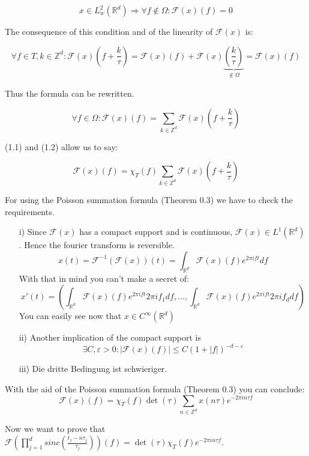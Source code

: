 \documentclass[a4paper, 11pt]{scrreprt}
\newcommand{\RR}{\mathbb{R}}
\newcommand{\ZZ}{\mathbb{Z}}
\newcommand{\FF}{\mathcal{F}}
\begin{document}
\begin{equation}
x \in L^2_w(\RR^d) \Rightarrow \forall f\notin \Omega: \FF(x)(f) = 0
\end{equation}

The consequence of this condition and of the linearity of \(\FF(x)\) is:

\[\forall f\in T, k \in \ZZ^d: \FF(x)\left(f+\frac{k}{\tau}\right) = \FF(x)(f) + \FF(x)\underbrace{\left(\frac{k}{\tau}\right)}_{\notin \Omega} = \FF(x)(f)\]

Thus the formula can be rewritten.

\begin{equation}
\forall f \in \Omega: \FF(x)(f) = \sum_{k \in \ZZ^d} \FF(x)\left( f+\frac{k}{\tau}\right)
\end{equation} 

(1.1) and (1.2) allow us to say:

\[\FF(x)(f) = \chi_{T}(f) \sum_{k \in \ZZ^d} \FF(x)\left(f+\frac{k}{\tau}\right)\]

For using the Poisson summation formula (Theorem 0.3) we have to check the requirements.

\begin{itemize}
	\item[i)] Since \(\FF(x)\) has a compact support and is continuous, \(\FF(x) \in L^1(\RR^d)\). Hence the fourier transform is reversible.
	 \[x(t) = \FF^{-1}(\FF(x))(t) = \int_{\RR^d}\FF(x)(f) e^{2 \pi i f t} df\]
	 With that in mind you can't make a secret of:
	 \[x'(t) = \left(\int_{\RR^d} \FF(x)(f) e^{2 \pi i f t} 2 \pi i f_1 df, \ldots, \int_{\RR^d} \FF(x)(f) e^{2 \pi i f t} 2 \pi i f_d df \right)\]
	 You can easily see now that \(x \in C^\infty(\RR^d)\)
	 \item[ii)] Another implication of the compact support is \[\exists C,\varepsilon>0: |\FF(x)(f)| \le C (1+|f|)^{-d-\varepsilon}\]
	 \item[iii)] Die dritte Bedingung ist schwieriger.
\end{itemize}

With the aid of the Poisson summation formula (Theorem 0.3) you can conclude:
\begin{equation}
\FF(x)(f) = \chi_{T}(f) \det(\tau) \sum_{n \in \ZZ^d} x(n\tau)e^{-2\pi i n\tau f}
\end{equation}

Now we want to prove that \(\FF\left( \prod_{j=1}^d sinc \left( \frac{t_j-n\tau_j}{\tau_j}\right)\right)(f) = \det(\tau)\chi_{T}(f)e^{-2\pi in\tau f}\).
\end{document}
